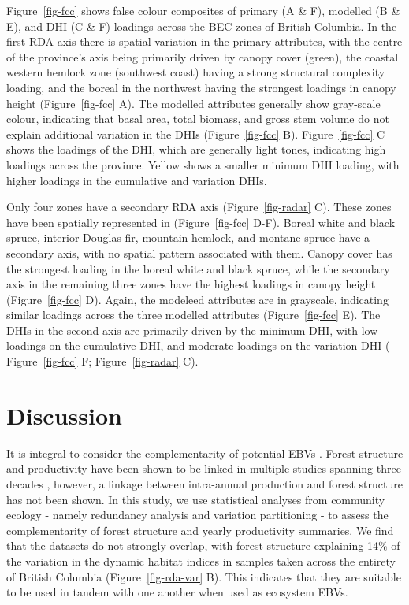 \documentclass[
  authoryear,
  review,
  3p,
  twocolumn]{elsarticle}
\begin{document}
Figure~\ref{fig-fcc} shows false colour composites of primary (A \& F),
modelled (B \& E), and DHI (C \& F) loadings across the BEC zones of
British Columbia. In the first RDA axis there is spatial variation in
the primary attributes, with the centre of the province's axis being
primarily driven by canopy cover (green), the coastal western hemlock
zone (southwest coast) having a strong structural complexity loading,
and the boreal in the northwest having the strongest loadings in canopy
height (Figure~\ref{fig-fcc} A). The modelled attributes generally show
gray-scale colour, indicating that basal area, total biomass, and gross
stem volume do not explain additional variation in the DHIs
(Figure~\ref{fig-fcc} B). Figure~\ref{fig-fcc} C shows the loadings of
the DHI, which are generally light tones, indicating high loadings
across the province. Yellow shows a smaller minimum DHI loading, with
higher loadings in the cumulative and variation DHIs.

Only four zones have a secondary RDA axis (Figure~\ref{fig-radar} C).
These zones have been spatially represented in (Figure~\ref{fig-fcc}
D-F). Boreal white and black spruce, interior Douglas-fir, mountain
hemlock, and montane spruce have a secondary axis, with no spatial
pattern associated with them. Canopy cover has the strongest loading in
the boreal white and black spruce, while the secondary axis in the
remaining three zones have the highest loadings in canopy height
(Figure~\ref{fig-fcc} D). Again, the modeleed attributes are in
grayscale, indicating similar loadings across the three modelled
attributes (Figure~\ref{fig-fcc} E). The DHIs in the second axis are
primarily driven by the minimum DHI, with low loadings on the cumulative
DHI, and moderate loadings on the variation DHI ( Figure~\ref{fig-fcc}
F; Figure~\ref{fig-radar} C).

\hypertarget{discussion}{%
\section{Discussion}\label{discussion}}

It is integral to consider the complementarity of potential EBVs
\citep{pereira2013, skidmore2021} . Forest structure and productivity
have been shown to be linked in multiple studies spanning three decades
\citep{ali2019, myneni1994}, however, a linkage between intra-annual
production and forest structure has not been shown. In this study, we
use statistical analyses from community ecology - namely redundancy
analysis and variation partitioning - to assess the complementarity of
forest structure and yearly productivity summaries. We find that the
datasets do not strongly overlap, with forest structure explaining 14\%
of the variation in the dynamic habitat indices in samples taken across
the entirety of British Columbia (Figure~\ref{fig-rda-var} B). This
indicates that they are suitable to be used in tandem with one another
when used as ecosystem EBVs.
\end{document}
